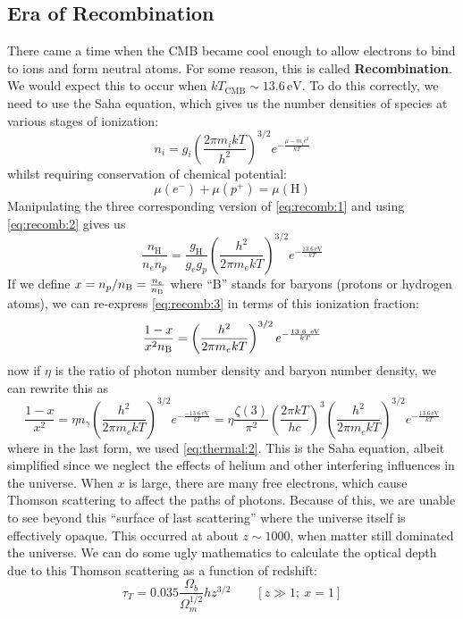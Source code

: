 \documentclass[10pt]{article}
\numberwithin{equation}{section}
\begin{document}
\subsection{Era of Recombination} %
\label{sub:era_of_recombination}
	There came a time when the CMB became cool enough to allow electrons to bind to ions and form neutral atoms. For some reason, this is called \textbf{Recombination}. We would expect this to occur when $kT_{\mathrm{CMB}}\sim 13.6\,\mathrm{eV}$. To do this correctly, we need to use the Saha equation, which gives us the number densities of species at various stages of ionization:
	\begin{equation}
		\label{eq:recomb:1} n_i = g_i \left(\frac{2\pi m_i kT}{h^2}\right)^{3/2}e^{-\frac{\mu -m_i c^2}{kT}}
	\end{equation}
	whilst requiring conservation of chemical potential:
	\begin{equation}
		\label{eq:recomb:2} \mu(e^-) + \mu(p^+) = \mu(\mathrm{H})
	\end{equation}
	Manipulating the three corresponding version of \eqref{eq:recomb:1} and using \eqref{eq:recomb:2} gives us
	\begin{equation}
		\label{eq:recomb:3} \frac{n_{\mathrm{H}}}{n_{e}n_p} = \frac{g_\mathrm{H}}{g_eg_p} \left(\frac{h^2}{2\pi m_ekT}\right)^{3/2} e^{-\frac{13.6\,\mathrm{eV}}{kT}}
	\end{equation}
	If we define $x=n_p/n_{\mathrm{\rm B}} = \frac{n_e}{n_{\rm B}}$ where ``B'' stands for baryons (protons or hydrogen atoms), we can re-express \eqref{eq:recomb:3} in terms of this ionization fraction:
	\begin{equation}
		\label{eq:recomb:4} \frac{1-x}{x^2n_{\rm B}} = \left(\frac{h^2}{2\pi m_e kT}\right)^{3/2}e^{-\frac{13.6\ \mathrm{eV}}{kT}}
	\end{equation}
	now if $\eta$ is the ratio of photon number density and baryon number density, we can rewrite this as
	\begin{equation}
		\label{eq:recomb:5} \frac{1-x}{x^2} = \eta n_\gamma\left(\frac{h^2}{2\pi m_e kT}\right)^{3/2} e^{-\frac{-13.6\,\mathrm{eV}}{kT}} = \eta\frac{\zeta(3)}{\pi^2}\left(\frac{2\pi k T}{hc}\right)^3 \left( \frac{h^2}{2\pi m_e kT}\right)^{3/2} e^{-\frac{13.6\,\mathrm{eV}}{kT}}
	\end{equation}
	where in the last form, we used \eqref{eq:thermal:2}. This is the Saha equation, albeit simplified since we neglect the effects of helium and other interfering influences in the universe. When $x$ is large, there are many free electrons, which cause Thomson scattering to affect the paths of photons. Because of this, we are unable to see beyond this ``surface of last scattering'' where the universe itself is effectively opaque. This occurred at about $z\sim 1000$, when matter still dominated the universe. We can do some ugly mathematics to calculate the optical depth due to this Thomson scattering as a function of redshift:
	\begin{equation}
		\label{eq:recomb:6} \tau_T = 0.035\frac{\Omega_b}{\Omega_m^{1/2}}hz^{3/2}\qquad [z\gg 1;\ x=1]
	\end{equation}
\end{document}
